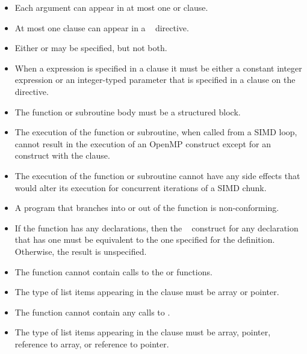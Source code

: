 \restrictions
\begin{itemize}
\item Each argument can appear in at most one  or  clause.

\item At most one  clause can appear in a ~ directive.

\item Either  or  may be specified, but not both.

\item When a  expression is specified in a  clause it must be
either a constant integer expression or an integer-typed parameter that is specified in
a  clause on the directive.

\item The function or subroutine body must be a structured block.

\item The execution of the function or subroutine, when called from a SIMD loop, cannot result in the execution of an OpenMP construct except for an  construct with the  clause. 

\item The execution of the function or subroutine cannot have any side effects that would 
alter its execution for concurrent iterations of a SIMD chunk.

\item A program that branches into or out of the function is non-conforming.

\ccppspecificstart
\item If the function has any declarations, then the ~ construct for any 
declaration that has one must be equivalent to the one specified for the definition. 
Otherwise, the result is unspecified.

\item The function cannot contain calls to the  or  functions. 
\ccppspecificend

\cspecificstart
\item The type of list items appearing in the  clause must be array or pointer. 
\cspecificend

\cppspecificstart
\item The function cannot contain any calls to . 

\item The type of list items appearing in the  clause must be array, pointer, 
reference to array, or reference to pointer.
\cppspecificend


\end{itemize}
